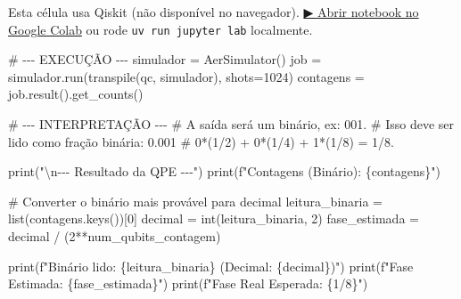 \documentclass[
  brazilian,
]{report}
\newenvironment{Shaded}{\begin{snugshade}}{\end{snugshade}}
\newcommand{\CommentTok}[1]{\textcolor[rgb]{0.37,0.37,0.37}{#1}}
\newcommand{\DecValTok}[1]{\textcolor[rgb]{0.68,0.00,0.00}{#1}}
\newcommand{\NormalTok}[1]{\textcolor[rgb]{0.00,0.23,0.31}{#1}}
\newcommand{\OperatorTok}[1]{\textcolor[rgb]{0.37,0.37,0.37}{#1}}
\begin{document}
\begin{tcolorbox}[enhanced jigsaw, arc=.35mm, bottomrule=.15mm, bottomtitle=1mm, breakable, colback=white, colbacktitle=quarto-callout-warning-color!10!white, colframe=quarto-callout-warning-color-frame, coltitle=black, left=2mm, leftrule=.75mm, opacityback=0, opacitybacktitle=0.6, rightrule=.15mm, title=\textcolor{quarto-callout-warning-color}{\faExclamationTriangle}\hspace{0.5em}{⚛️ Célula Qiskit --- execute no Colab ou localmente}, titlerule=0mm, toprule=.15mm, toptitle=1mm]

Esta célula usa Qiskit (não disponível no navegador).
\href{https://colab.research.google.com/github/maxwellamaral/aula-quantum/blob/main/notebooks/07-quantum-fourier-transform.ipynb}{▶
Abrir notebook no Google Colab} ou rode \texttt{uv\ run\ jupyter\ lab}
localmente.

\begin{Shaded}
\begin{Highlighting}[]


\CommentTok{\# {-}{-}{-} EXECUÇÃO {-}{-}{-}}
\NormalTok{simulador }\OperatorTok{=}\NormalTok{ AerSimulator()}
\NormalTok{job }\OperatorTok{=}\NormalTok{ simulador.run(transpile(qc, simulador), shots}\OperatorTok{=}\DecValTok{1024}\NormalTok{)}
\NormalTok{contagens }\OperatorTok{=}\NormalTok{ job.result().get\_counts()}
\end{Highlighting}
\end{Shaded}

\end{tcolorbox}

\begin{Shaded}
\begin{Highlighting}[]


\NormalTok{\# {-}{-}{-} INTERPRETAÇÃO {-}{-}{-}}
\NormalTok{\# A saída será um binário, ex: \textquotesingle{}001\textquotesingle{}.}
\NormalTok{\# Isso deve ser lido como fração binária: 0.001}
\NormalTok{\# 0*(1/2) + 0*(1/4) + 1*(1/8) = 1/8.}

\NormalTok{print("\textbackslash{}n{-}{-}{-} Resultado da QPE {-}{-}{-}")}
\NormalTok{print(f"Contagens (Binário): \{contagens\}")}

\NormalTok{\# Converter o binário mais provável para decimal}
\NormalTok{leitura\_binaria = list(contagens.keys())[0]}
\NormalTok{decimal = int(leitura\_binaria, 2)}
\NormalTok{fase\_estimada = decimal / (2**num\_qubits\_contagem)}

\NormalTok{print(f"Binário lido: \{leitura\_binaria\} (Decimal: \{decimal\})")}
\NormalTok{print(f"Fase Estimada: \{fase\_estimada\}")}
\NormalTok{print(f"Fase Real Esperada: \{1/8\}")}
\end{Highlighting}
\end{Shaded}
\end{document}
